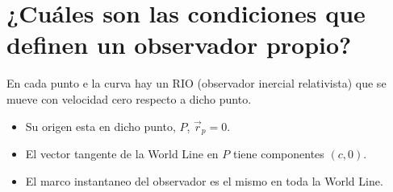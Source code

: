 \section{¿Cuáles son las condiciones que definen un observador propio?}

En cada punto e la curva hay un RIO (observador inercial relativista) que se mueve con velocidad cero respecto a dicho punto.

\begin{itemize}
	\item Su origen esta en dicho punto, $P$, $\vec{r}_p = 0$.
	\item El vector tangente de la World Line en $P$ tiene componentes $(c,0)$.
	\item El marco instantaneo del observador es el mismo en toda la World Line.
\end{itemize}